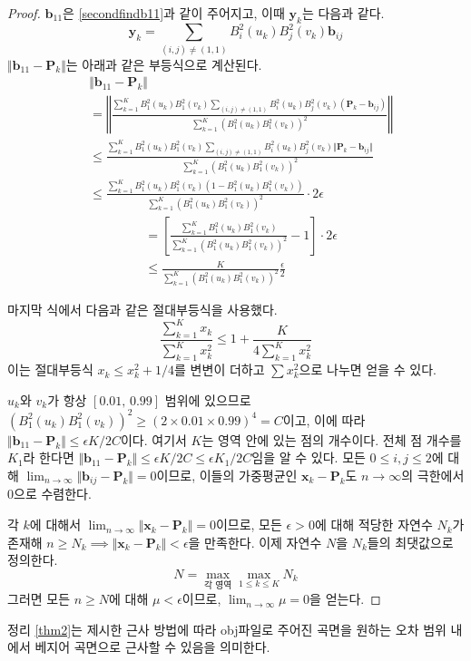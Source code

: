 \documentclass{gshs_thesis}
\theoremstyle{theorem}
\theoremstyle{lemma}
\theoremstyle{definition}
\begin{document}
\begin{proof}
	$\mathbf{b}_{11}$은 \eqref{secondfindb11}과 같이 주어지고, 이때 $\mathbf{y}_k$는 다음과 같다.
	$$ \mathbf{y}_k = \sum_{(i, j) \neq (1, 1)} B_i^2(u_k) B_j^2(v_k) \mathbf{b}_{ij} $$ $\Vert \mathbf{b}_{11} - \mathbf{P}_k \Vert$는 아래과 같은 부등식으로 계산된다. 
	\begin{align*}
		&\Vert \mathbf{b}_{11} - \mathbf{P}_k \Vert \\
		&= \left\Vert \frac{\sum_{k=1}^K B_1^2(u_k) B_1^2(v_k) \sum_{(i, j) \neq (1, 1)} B_i^2(u_k) B_j^2(v_k) (\mathbf{P}_k - \mathbf{b}_{ij})}{\sum_{k=1}^K (B_1^2(u_k) B_1^2(v_k))^2} \right\Vert \\
		&\leq \frac{\sum_{k=1}^K B_1^2(u_k) B_1^2(v_k) \sum_{(i, j) \neq (1, 1)} B_i^2(u_k) B_j^2(v_k) \Vert \mathbf{P}_k - \mathbf{b}_{ij} \Vert}{\sum_{k=1}^K (B_1^2(u_k) B_1^2(v_k))^2} \\
		&\leq \frac{\sum_{k=1}^K B_1^2(u_k) B_1^2(v_k) (1 - B_1^2(u_k) B_1^2(v_k))}{\sum_{k=1}^K (B_1^2(u_k) B_1^2(v_k))^2} \cdot 2\epsilon
	\end{align*}
    \begin{align*}
		&= \left[ \frac{\sum_{k=1}^K B_1^2(u_k) B_1^2(v_k)}{\sum_{k=1}^K (B_1^2(u_k) B_1^2(v_k))^2} - 1 \right] \cdot 2\epsilon \\
		&\leq \frac{K}{\sum_{k=1}^K (B_1^2(u_k) B_1^2(v_k))^2} \frac\epsilon2
	\end{align*}
	
	마지막 식에서 다음과 같은 절대부등식을 사용했다.
	$$ \frac{\sum_{k=1}^K x_k}{\sum_{k=1}^K x_k^2} \leq 1 + \frac{K}{4\sum_{k=1}^K x_k^2} $$
	이는 절대부등식 $x_k \leq x_k^2 + 1/4$를 변변이 더하고 $\sum x_k^2$으로 나누면 얻을 수 있다. 
	
	$u_k$와 $v_k$가 항상 $[0.01, \, 0.99]$ 범위에 있으므로 $(B_1^2(u_k) B_1^2(v_k))^2 \geq (2 \times 0.01 \times 0.99)^4 = C$이고, 이에 따라 $\Vert \mathbf{b}_{11} - \mathbf{P}_k \Vert \leq \epsilon K / 2C$이다. 여기서 $K$는 영역 안에 있는 점의 개수이다. 전체 점 개수를 $K_{1}$라 한다면  $\Vert \mathbf{b}_{11} - \mathbf{P}_k \Vert \leq \epsilon K / 2C \leq \epsilon K_{1} / 2C$임을 알 수 있다. 모든 $0 \leq i, j \leq 2$에 대해 $\lim_{n \to \infty} \Vert \mathbf{b}_{ij} - \mathbf{P}_k \Vert = 0$이므로, 이들의 가중평균인 $\mathbf{x}_k - \mathbf{P}_k$도 $n \to \infty$의 극한에서 $0$으로 수렴한다. 
	
	각 $k$에 대해서 $\lim_{n \to \infty} \Vert \mathbf{x}_k - \mathbf{P}_k \Vert = 0$이므로, 모든 $\epsilon > 0$에 대해 적당한 자연수 $N_k$가 존재해 $n \geq N_k \implies \Vert \mathbf{x}_k - \mathbf{P}_k \Vert < \epsilon$을 만족한다. 이제 자연수 $N$을 $N_k$들의 최댓값으로 정의한다. 
	$$ N = \max_{\text{각 영역}} \max_{1 \leq k \leq K} N_k $$
	그러면 모든 $n \geq N$에 대해 $\mu < \epsilon$이므로, $\lim_{n \to \infty} \mu = 0$을 얻는다. 
\end{proof}
정리 \ref{thm2}는 제시한 근사 방법에 따라 obj파일로 주어진 곡면을 원하는 오차 범위 내에서 베지어 곡면으로 근사할 수 있음을 의미한다. \\
\end{document}
